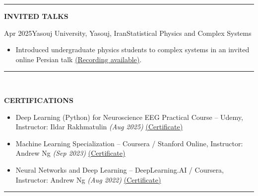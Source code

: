 \documentclass[12pt, b4paper]{cv}
\begin{document}
\vspace{-0.15in}
\rule{\textwidth}{1pt}
\vspace{-0.15in}



{\Large \textbf{INVITED TALKS}}
\vspace{0.1in}

\begin{school}{Apr 2025}{Yasouj University, Yasouj, Iran}{Statistical Physics and Complex Systems}
\vspace{-0.1in}
\begin{itemize}[leftmargin=*]
    \item Introduced undergraduate physics students to complex systems in an invited online Persian talk
          \href{https://www.aparat.com/v/szyh283}{(Recording available)}.
\end{itemize}
\end{school}



\vspace{-0.15in}
\rule{\textwidth}{1pt}\\
\vspace{-0.15in}

{\Large \textbf{CERTIFICATIONS}}
\vspace{-5pt}

\begin{itemize}[leftmargin=*]
    \item Deep Learning (Python) for Neuroscience EEG Practical Course -- Udemy, Instructor: Ildar Rakhmatulin \textit{(Aug 2025)}
          \href{https://www.udemy.com/certificate/UC-1c61cc70-1c1f-49fc-b6b1-972fa68f97df/}{(Certificate)}
    \item Machine Learning Specialization -- Coursera / Stanford Online, Instructor: Andrew Ng \textit{(Sep 2023)}
          \href{https://coursera.org/share/73ec39657746dc6a319fa5a123047ccf}{(Certificate)}
    \item Neural Networks and Deep Learning -- DeepLearning.AI / Coursera, Instructor: Andrew Ng \textit{(Aug 2022)}
          \href{https://coursera.org/share/601e36dd06712caa01ff9b867a6bf7a7}{(Certificate)}
\end{itemize}



\vspace{-0.15in}
\rule{\textwidth}{1pt}\\
\vspace{-0.15in}
\end{document}
